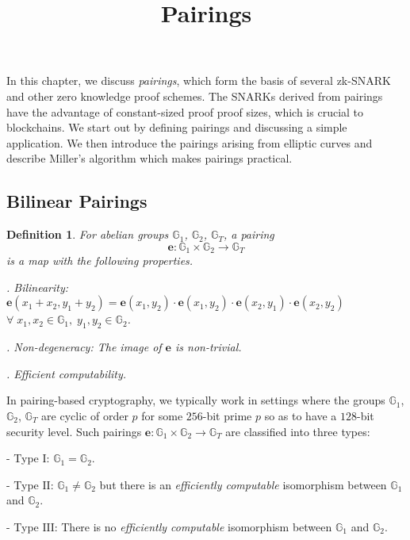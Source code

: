 \documentclass[11pt, lettersize, notitlepage, leqno, footskip=0.6cm]{article}
\newcommand{\lra}{\longrightarrow}
\newcommand{\mb}{\mathbb}
\newcommand{\mr}{\mathrm}
\newtheorem{Def}{Definition}[section]
\numberwithin{equation}{section}
\begin{document}
 
\title{Pairings}
\author{}
\date{}
 
\maketitle


In this chapter, we discuss \textit{pairings}, which form the basis of several zk-SNARK and other zero knowledge proof schemes. The SNARKs derived from pairings have the advantage of constant-sized proof proof sizes, which is crucial to blockchains. We start out by defining pairings and discussing a simple application. We then introduce the pairings arising from elliptic curves and describe Miller's algorithm which makes pairings practical.




\subsection{\fontsize{11}{11}\selectfont Bilinear Pairings}


\begin{Def} \normalfont For abelian groups $\mb{G}_1$, $\mb{G}_2$, $\mb{G}_T$, a \textit{pairing} $$\mathbf{e}:\mb{G}_1\times \mb{G}_2 \lra \mb{G}_T$$ is a map with the following properties.

. Bilinearity: $\mathbf{e}(x_1+x_2,y_1+y_2) = \mathbf{e}(x_1, y_2)\cdot\mathbf{e}(x_1, y_2)\cdot\mathbf{e}(x_2, y_1)\cdot\mathbf{e}(x_2, y_2)$\\ $\forall\; x_1,x_2\in \mb{G}_1,\; y_1,y_2\in \mb{G}_2$.

. Non-degeneracy: The image of $\mathbf{e}$ is non-trivial.

. Efficient computability.\end{Def}

In pairing-based cryptography, we typically work in settings where the groups $\mb{G}_1$, $\mb{G}_2$, $\mb{G}_T$ are cyclic of order $p$ for some $256$-bit prime $p$ so as to have a $128$-bit security level. Such pairings $\mathbf{e}:\mb{G}_1\times \mb{G}_2 \lra \mb{G}_T$ are classified into three types:

\noindent - Type $\mr{I}$: $\mb{G}_1 = \mb{G}_2$.

\noindent - Type $\mr{II}$: $\mb{G}_1 \neq \mb{G}_2$ but there is an \textit{efficiently computable} isomorphism between $\mb{G}_1$ and $\mb{G}_2$.

\noindent - Type $\mr{III}$: There is no \textit{efficiently computable} isomorphism between $\mb{G}_1$ and $\mb{G}_2$.
\end{document}

